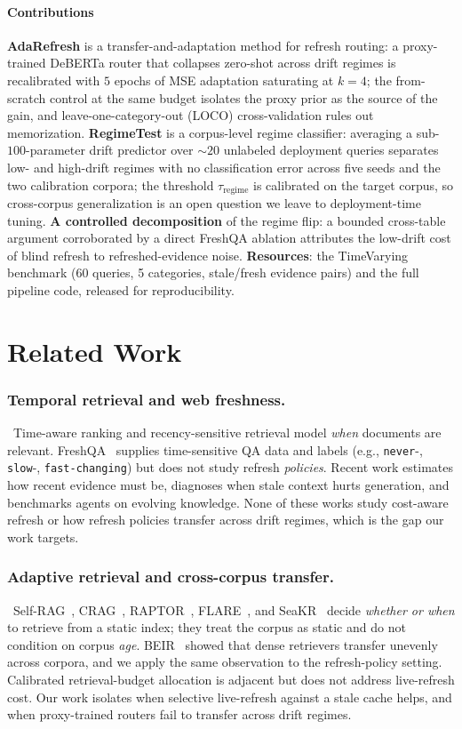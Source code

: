 \documentclass[pdflatex,sn-basic]{sn-jnl}
\begin{document}
\paragraph*{Contributions}
\textbf{AdaRefresh} is a transfer-and-adaptation method for refresh routing: a proxy-trained DeBERTa router that collapses zero-shot across drift regimes is recalibrated with $5$ epochs of MSE adaptation saturating at $k{=}4$; the from-scratch control at the same budget isolates the proxy prior as the source of the gain, and leave-one-category-out (LOCO) cross-validation rules out memorization.
\medskip
\textbf{RegimeTest} is a corpus-level regime classifier: averaging a sub-$100$-parameter drift predictor over ${\sim}20$ unlabeled deployment queries separates low- and high-drift regimes with no classification error across five seeds and the two calibration corpora; the threshold $\tau_{\text{regime}}$ is calibrated on the target corpus, so cross-corpus generalization is an open question we leave to deployment-time tuning.
\medskip
\textbf{A controlled decomposition} of the regime flip: a bounded cross-table argument corroborated by a direct FreshQA ablation attributes the low-drift cost of blind refresh to refreshed-evidence noise.
\medskip
\textbf{Resources}: the TimeVarying benchmark (60 queries, 5 categories, stale/fresh evidence pairs) and the full pipeline code, released for reproducibility.
\section{Related Work}
\label{sec:related}

\subsubsection*{Temporal retrieval and web freshness.}~Time-aware ranking and recency-sensitive retrieval model \emph{when} documents are relevant. FreshQA~\cite{vu2023freshqa} supplies time-sensitive QA data and labels (e.g., \texttt{never}-, \texttt{slow}-, \texttt{fast-changing}) but does not study refresh \emph{policies}. Recent work estimates how recent evidence must be, diagnoses when stale context hurts generation, and benchmarks agents on evolving knowledge. None of these works study cost-aware refresh or how refresh policies transfer across drift regimes, which is the gap our work targets.

\subsubsection*{Adaptive retrieval and cross-corpus transfer.}~Self-RAG~\cite{asai2023selfrag}, CRAG~\cite{crag2024}, RAPTOR~\cite{raptor2024}, FLARE~\cite{jiang2023flare}, and SeaKR~\cite{seakr2025} decide \emph{whether or when} to retrieve from a static index; they treat the corpus as static and do not condition on corpus \emph{age}. BEIR~\cite{thakur2021beir} showed that dense retrievers transfer unevenly across corpora, and we apply the same observation to the refresh-policy setting. Calibrated retrieval-budget allocation is adjacent but does not address live-refresh cost. Our work isolates when selective live-refresh against a stale cache helps, and when proxy-trained routers fail to transfer across drift regimes.
\end{document}
